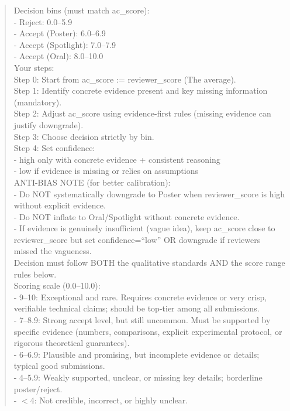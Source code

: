 \begin{quote}
\begin{tcolorbox}[breakable,colback=report!20!white, colframe=report!60!black, title=\textbf{Prompt for Report Agent (Meta-Review)}]
        Decision bins (must match ac\_score):\\
        - Reject: 0.0–5.9\\
        - Accept (Poster): 6.0–6.9\\
        - Accept (Spotlight): 7.0–7.9\\
        - Accept (Oral): 8.0–10.0\\

        Your steps:\\
        Step 0: Start from ac\_score := reviewer\_score (The average).\\
        Step 1: Identify concrete evidence present and key missing information (mandatory).\\
        Step 2: Adjust ac\_score using evidence-first rules (missing evidence can justify downgrade).\\
        Step 3: Choose decision strictly by bin.\\
        Step 4: Set confidence: \\
        - high only with concrete evidence + consistent reasoning\\
        - low if evidence is missing or relies on assumptions\\

        ANTI-BIAS NOTE (for better calibration):\\
        - Do NOT systematically downgrade to Poster when reviewer\_score is high without explicit evidence.\\
        - Do NOT inflate to Oral/Spotlight without concrete evidence.\\
        - If evidence is genuinely insufficient (vague idea), keep ac\_score close to reviewer\_score but set confidence=``low'' OR downgrade if reviewers missed the vagueness.\\

        Decision must follow BOTH the qualitative standards AND the score range rules below.\\
        Scoring scale (0.0–10.0):\\
        - 9–10: Exceptional and rare. Requires concrete evidence or very crisp, verifiable technical claims; should be top-tier among all submissions.\\
        - 7–8.9: Strong accept level, but still uncommon. Must be supported by specific evidence (numbers, comparisons, explicit experimental protocol, or rigorous theoretical guarantees).\\
        - 6–6.9: Plausible and promising, but incomplete evidence or details; typical good submissions.\\
        - 4–5.9: Weakly supported, unclear, or missing key details; borderline poster/reject.\\
        - $<$4: Not credible, incorrect, or highly unclear.\\


\end{tcolorbox}
\end{quote}
